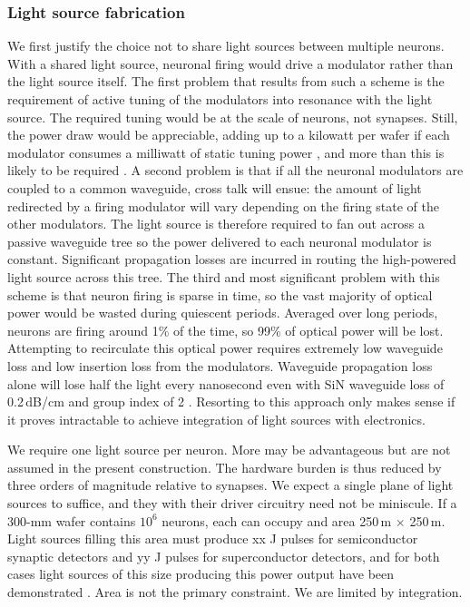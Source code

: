 \documentclass[twocolumn]{article}
\begin{document}
\subsubsection{Light source fabrication}
We first justify the choice not to share light sources between multiple neurons. With a shared light source, neuronal firing would drive a modulator rather than the light source itself. The first problem that results from such a scheme is the requirement of active tuning of the modulators into resonance with the light source. The required tuning would be at the scale of neurons, not synapses. Still, the power draw would be appreciable, adding up to a kilowatt per wafer if each modulator consumes a milliwatt of static tuning power \cite{shfe2010}, and more than this is likely to be required \cite{shor2013}. A second problem is that if all the neuronal modulators are coupled to a common waveguide, cross talk will ensue: the amount of light redirected by a firing modulator will vary depending on the firing state of the other modulators. The light source is therefore required to fan out across a passive waveguide tree so the power delivered to each neuronal modulator is constant. Significant propagation losses are incurred in routing the high-powered light source across this tree. The third and most significant problem with this scheme is that neuron firing is sparse in time, so the vast majority of optical power would be wasted during quiescent periods. Averaged over long periods, neurons are firing around 1\% of the time, so 99\% of optical power will be lost. Attempting to recirculate this optical power requires extremely low waveguide loss and low insertion loss from the modulators. Waveguide propagation loss alone will lose half the light every nanosecond even with SiN waveguide loss of 0.2\,dB/cm and group index of 2 \cite{chna2018}. Resorting to this approach only makes sense if it proves intractable to achieve integration of light sources with electronics.

We require one light source per neuron. More may be advantageous but are not assumed in the present construction. The hardware burden is thus reduced by three orders of magnitude relative to synapses. We expect a single plane of light sources to suffice, and they with their driver circuitry need not be miniscule. If a 300-mm wafer contains $10^6$ neurons, each can occupy and area 250\,\textmu m $\times$ 250\,\textmu m. Light sources filling this area must produce xx J pulses for semiconductor synaptic detectors and yy J pulses for superconductor detectors, and for both cases light sources of this size producing this power output have been demonstrated \cite{}. Area is not the primary constraint. We are limited by integration.
\end{document}
